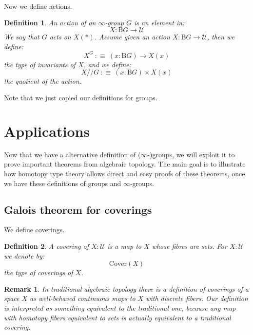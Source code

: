 \documentclass{article}
\newcommand{\se}[1]{\medbreak \medbreak \section{#1}}
\newcommand{\sse}[1]{\medbreak \subsection{#1}}
\newcommand{\U}{{\mathcal U}}
\renewcommand{\r}{\rightarrow}
\newcommand{\B}{\mathrm{B}}
\newtheorem{definition}{Definition}
\newtheorem{remark}{Remark}
\begin{document}
Now we define actions.

\begin{definition}
An action of an $\infty$-group $G$ is an element in:
\[X : \B G \r \U\]
We say that $G$ acts on $X(*)$. Assume given an action $X:\B G \r \U$, then we define:
\[X^G \ :\equiv\ (x:\B G)\r X(x)\]
the type of invariants of $X$, and we define:
\[X//G \ :\equiv\ (x:\B G)\times X(x)\]
the quotient of the action. 
\end{definition}

Note that we just copied our definitions for groups.








\se{Applications}

Now that we have a alternative definition of ($\infty$-)groups, we will exploit it to prove important theorems from algebraic topology. The main goal is to illustrate how homotopy type theory allows direct and easy proofs of these theorems, once we have these definitions of groups and $\infty$-groups.



\sse{Galois theorem for coverings}

We define coverings.

\begin{definition}
A covering of $X:\U$ is a map to $X$ whose fibres are sets. For $X:\U$ we denote by:
\[\mathrm{Cover}(X)\]
the type of coverings of $X$.
\end{definition} 

\begin{remark}
In traditional algebraic topology there is a definition of coverings of a space $X$ as well-behaved continuous maps to $X$ with discrete fibers. Our definition is interpreted as something equivalent to the traditional one, because any map with homotopy fibers equivalent to sets is actually equivalent to a traditional covering.
\end{remark}
\end{document}
